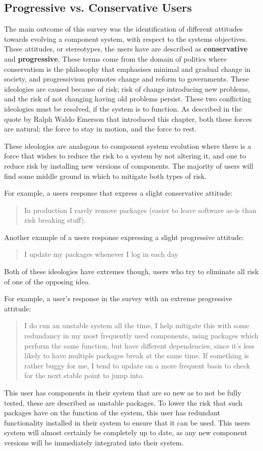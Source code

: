 \subsection{Progressive vs. Conservative Users}
The main outcome of this survey was the identification of different attitudes towards evolving a component system, with respect to the systems objectives.
These attitudes, or stereotypes, the users have are described as \textbf{conservative} and \textbf{progressive}.
These terms come from the domain of politics where conservatism is the philosophy that emphasises minimal and gradual change in society,
and progressivism promotes change and reform to governments.
These ideologies are caused because of risk; risk of change introducing new problems, and the risk of not changing having old problems persist.
These two conflicting ideologies must be resolved, if the system is to function. 
As described in the quote by Ralph Waldo Emerson that introduced this chapter, both these forces are natural;
the force to stay in motion, and the force to rest.

These ideologies are analogous to component system evolution where there is a force that wishes to reduce the risk to a system by not altering it,
and one to reduce risk by installing new versions of components.
The majority of users will find some middle ground in which to mitigate both types of risk.

For example, a users response that express a slight conservative attitude:
\begin{quotation}
In production I rarely remove packages (easier to leave software as-is than risk breaking stuff).
\end{quotation}

Another example of a users response expressing a slight progressive attitude:
\begin{quotation}
I update my packages whenever I log in each day
\end{quotation}

Both of these ideologies have extremes though, users who try to eliminate all risk of one of the opposing idea.

For example, a user's response in the survey with an extreme progressive attitude:
\begin{quotation}
I do run an unstable system all the time, I help mitigate this with some redundancy in my most frequently used components, 
using packages which perform the same function, but have different dependencies, since it's less likely to have multiple packages break at the same time. 
If something is rather buggy for me, I tend to update on a more frequent basis to check for the next stable point to jump into.
\end{quotation}
This user has components in their system that are so new as to not be fully tested, these are described as unstable packages.
To lower the risk that such packages have on the function of the system, this user has redundant functionality installed in their system to ensure that it can be used.
This users system will almost certainly be completely up to date, as any new component versions will be immediately integrated into their system.

